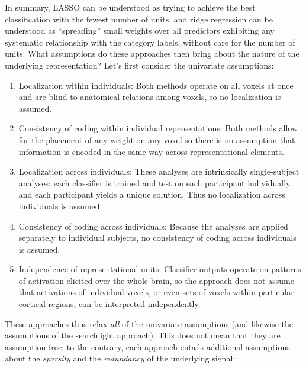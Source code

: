 In summary, LASSO can be understood as trying to achieve the best classification with the fewest number of units, and ridge regression can be understood as ``spreading'' small weights over all predictors exhibiting any systematic relationship with the category labels, without care for the number of units. What assumptions do these approaches then bring about the nature of the underlying representation? Let's first consider the univariate assumptions: 

\begin{enumerate}
\item Localization within individuals: Both methods operate on all voxels at once and are blind to anatomical relations among voxels, so no localization is assumed.

\item Consistency of coding within individual representations: Both methods allow for the placement of any weight on any voxel so there is no assumption that information is encoded in the same way across representational elements.

\item Localization across individuals: These analyses are intrinsically single-subject analyses: each classifier is trained and test on each participant individually, and each participant yields a unique solution. Thus no localization across individuals is assumed

\item Consistency of coding across individuals: Because the analyses are applied separately to individual subjects, no consistency of coding across individuals is assumed.

\item Independence of representational units: Classifier outputs operate on patterns of activation elicited over the whole brain, so the approach does not assume that activations of individual voxels, or even sets of voxels within particular cortical regions, can be interpreted independently.
\end{enumerate}

These approaches thus relax {\em all} of the univariate assumptions (and likewise the assumptions of the searchlight approach). This does not mean that they are assumption-free: to the contrary, each approach entails additional assumptions about the {\em sparsity} and the {\em redundancy} of the underlying signal:

